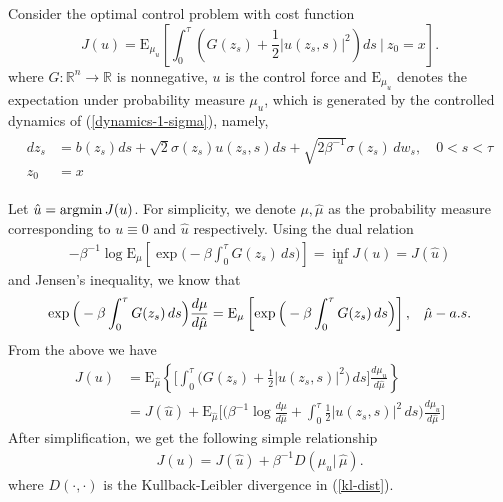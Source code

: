 \documentclass[final]{siamltex}
\newcommand{\argmin}{\mathop{\rm argmin}}%
\begin{document}
Consider the optimal control problem with cost function
\begin{equation}
  J(u) = \mathrm{E}_{\mu_u}\left[\int_0^\tau \left(G(z_s) + \frac{1}{2} |u(z_s,s)|^2
\right) ds ~\bigg|~ z_0 = x\right].
\end{equation}
where $G : \mathbb{R}^n\rightarrow \mathbb{R}$ is nonnegative, $u$ is the
control force and $\mathrm{E}_{\mu_u}$ denotes the expectation under probability measure $\mu_u$,
which is generated by the controlled dynamics
of (\ref{dynamics-1-sigma}), namely,
\begin{align}
 \begin{split}
   d z_s &= b(z_s) ds + \sqrt{2}\sigma(z_s) u(z_s, s) ds + \sqrt{2\beta^{-1}} \sigma(z_s)\,dw_s, \quad 0 < s < \tau \\
    z_0&=x
  \end{split}
  \label{dynamics-1-sigmma-c}
\end{align}

Let $\hat{u} = \argmin J(u)$. For simplicity, we denote $\mu, \hat{\mu}$ as
the probability measure corresponding to $u \equiv 0$ and $\hat{u}$ respectively. Using the dual relation
    \begin{align}
      -\beta^{-1}\log \mathrm{E}_\mu\left[\exp\Big(-\beta\int_0^\tau G(z_s)\, ds\Big)\right] = \inf_u J(u) = J(\hat{u})
      \label{dual-relation}
    \end{align}
    and Jensen's inequality, we know that 
    \begin{align}
    \exp\Big(-\beta\int_0^\tau G(z_s)\,ds\Big)\frac{d\mu}{d\hat{\mu}} =
    \mathrm{E}_\mu\left[\exp\Big(-\beta\int_0^\tau G(z_s)\, ds\Big)\right],
    \hspace{3mm} \hat{\mu}-a.s.
    \label{jensen-as}
  \end{align}
From the above we have 
  \begin{align}
    J(u) &= \mathrm{E}_{\hat{\mu}} \left\{\Big[\int_0^\tau \Big(G(z_s) + \frac{1}{2} |u(z_s,
    s)|^2\Big)\,ds\Big]\frac{d\mu_u}{d\hat{\mu}}\right\}  \\
    & = J(\hat{u}) + \mathrm{E}_{\hat{\mu}}\Big[\Big(\beta^{-1}\log
    \frac{d\mu}{d\hat{\mu}} + \int_0^\tau \frac{1}{2} |u(z_s,
    s)|^2\,ds\Big)\frac{d\mu_u}{d\hat{\mu}}\Big]
\end{align}
After simplification, we get the following simple relationship 
\begin{align}
J(u) = J(\hat{u}) + \beta^{-1}D(\mu_u|\, \hat{\mu}).
\label{J-entropy}
\end{align}
where $D(\cdot, \cdot)$ is the Kullback-Leibler divergence in (\ref{kl-dist}).
\end{document}
